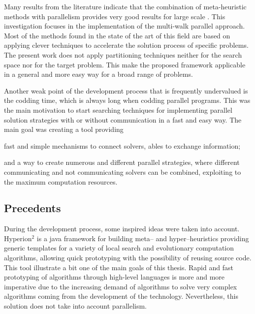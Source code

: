 Many results from the literature indicate that the combination of meta-heuristic methods with parallelism provides very good results for large scale \csps. This investigation focuses in the implementation of the multi-walk parallel approach. Most of the methods found in the state of the art of this field are based on applying clever techniques to accelerate the solution process of specific problems. The present work does not apply partitioning techniques neither for the search space nor for the target problem. This make the proposed framework applicable in a general and more easy way for a broad range of problems.

Another weak point of the development process that is frequently undervalued is the codding time, which is always long when codding parallel programs. This was the main motivation to start searching techniques for implementing parallel solution strategies with or without communication in a fast and easy way. The main goal was creating a tool providing 
\begin{inparaenum}[1-]
\item fast and simple mechanisms to connect solvers, ables to exchange information; 
\item and a way to create numerous and different parallel strategies, where different communicating and not communicating solvers can be combined, exploiting to the maximum computation resources.
\end{inparaenum}

\subsection{Precedents}

During the development process, some inspired ideas were taken into account. {\sc Hyperion}$^2$ \cite{Brownlee2014} is a java framework for building meta-- and hyper--heuristics providing generic templates for a variety of local search and evolutionary computation algorithms, allowing quick prototyping with the possibility of reusing source code. This tool illustrate a bit one of the main goals of this thesis. Rapid and fast prototyping of algorithms through high-level languages is more and more imperative due to the increasing demand of algorithms to solve very complex algorithms coming from the development of the technology. Nevertheless, this solution does not take into account parallelism.

